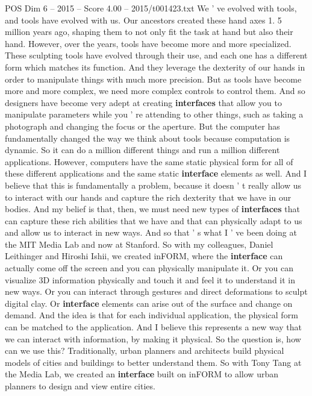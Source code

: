 \begin{textsample}{POS Dim 6 – 2015 – Score 4.00 – 2015/t001423.txt}  \label{ex:f6_pos_052}
We ' ve evolved with tools, and tools have evolved with us.
Our ancestors created these hand axes 1. 5 million years ago, shaping them to not only fit the task at hand but also their hand.
However, over the years, tools have become more and more specialized.
These sculpting tools have evolved through their use, and each one has a different form which matches its function.
And they leverage the dexterity of our hands in order to manipulate things with much more precision.
But as tools have become more and more complex, we need more complex controls to control them.
And so designers have become very adept at creating \textbf{interfaces} that allow you to manipulate parameters while you ' re attending to other things, such as taking a photograph and changing the focus or the aperture.
But the computer has fundamentally changed the way we think about tools because computation is dynamic.
So it can do a million different things and run a million different applications.
However, computers have the same static physical form for all of these different applications and the same static \textbf{interface} elements as well.
And I believe that this is fundamentally a problem, because it doesn ' t really allow us to interact with our hands and capture the rich dexterity that we have in our bodies.
And my belief is that, then, we must need new types of \textbf{interfaces} that can capture these rich abilities that we have and that can physically adapt to us and allow us to interact in new ways.
And so that ' s what I ' ve been doing at the MIT Media Lab and now at Stanford.
So with my colleagues, Daniel Leithinger and Hiroshi Ishii, we created inFORM, where the \textbf{interface} can actually come off the screen and you can physically manipulate it.
Or you can visualize 3D information physically and touch it and feel it to understand it in new ways.
Or you can interact through gestures and direct deformations to sculpt digital clay.
Or \textbf{interface} elements can arise out of the surface and change on demand.
And the idea is that for each individual application, the physical form can be matched to the application.
And I believe this represents a new way that we can interact with information, by making it physical.
So the question is, how can we use this?
Traditionally, urban planners and architects build physical models of cities and buildings to better understand them.
So with Tony Tang at the Media Lab, we created an \textbf{interface} built on inFORM to allow urban planners to design and view entire cities.

\end{textsample}
